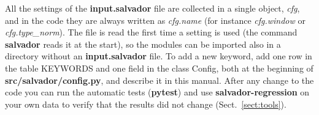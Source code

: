 \documentclass[modern]{aastex701}
\begin{document}
All the settings of the {\bf input.salvador} file are collected in a single object, {\it cfg}, and in the code they are always written as {\it cfg.name} (for instance {\it cfg.window} or {\it cfg.type\_norm}). The file is read the first time a setting is used (the command {\bf salvador} reads it at the start), so the modules can be imported also in a directory without an {\bf input.salvador} file. To add a new keyword, add one row in the table KEYWORDS and one field in the class Config, both at the beginning of {\bf src/salvador/config.py}, and describe it in this manual. After any change to the code you can run the automatic tests ({\bf pytest}) and use {\bf salvador-regression} on your own data to verify that the results did not change (Sect.~\ref{sect:tools}).
\end{document}
